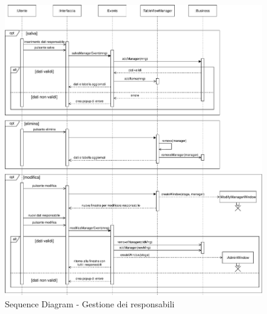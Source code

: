 \documentclass[a4paper,11pt]{article}
\begin{document}
\begin{figure}[htpb]
	\centering
	\hspace*{-2cm}
	\includegraphics[width=1.3\textwidth]{diagrams/Sequence_Diagram_-_Managers.pdf}
	\caption{Sequence Diagram - Gestione dei responsabili}
	\label{fig:sqc_dia_man}
\end{figure}
\end{document}
